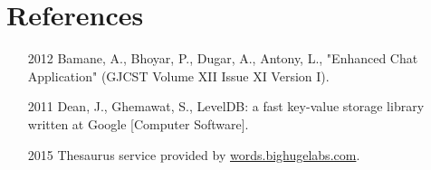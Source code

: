 \documentclass[12pt,a4paper]{article}
\begin{document}
\section{References}

\begin{enumerate}
\item [2012] Bamane, A., Bhoyar, P., Dugar, A., Antony, L., "Enhanced Chat Application" (GJCST Volume XII Issue XI Version I).

\item [2011] Dean, J., Ghemawat, S., LevelDB: a fast key-value storage library written at Google [Computer Software].

\item [2015] Thesaurus service provided by \url{words.bighugelabs.com}.
\end{enumerate}
\end{document}
